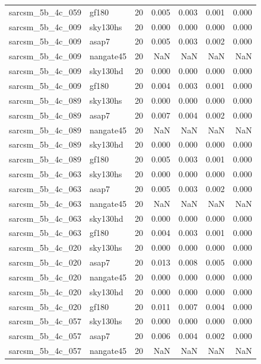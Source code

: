 \begin{tabular}{llrrrrr}
sarcsm\_5b\_4c\_059 & gf180 & 20 & 0.005 & 0.003 & 0.001 & 0.000 \\
sarcsm\_5b\_4c\_009 & sky130hs & 20 & 0.000 & 0.000 & 0.000 & 0.000 \\
sarcsm\_5b\_4c\_009 & asap7 & 20 & 0.005 & 0.003 & 0.002 & 0.000 \\
sarcsm\_5b\_4c\_009 & nangate45 & 20 & NaN & NaN & NaN & NaN \\
sarcsm\_5b\_4c\_009 & sky130hd & 20 & 0.000 & 0.000 & 0.000 & 0.000 \\
sarcsm\_5b\_4c\_009 & gf180 & 20 & 0.004 & 0.003 & 0.001 & 0.000 \\
sarcsm\_5b\_4c\_089 & sky130hs & 20 & 0.000 & 0.000 & 0.000 & 0.000 \\
sarcsm\_5b\_4c\_089 & asap7 & 20 & 0.007 & 0.004 & 0.002 & 0.000 \\
sarcsm\_5b\_4c\_089 & nangate45 & 20 & NaN & NaN & NaN & NaN \\
sarcsm\_5b\_4c\_089 & sky130hd & 20 & 0.000 & 0.000 & 0.000 & 0.000 \\
sarcsm\_5b\_4c\_089 & gf180 & 20 & 0.005 & 0.003 & 0.001 & 0.000 \\
sarcsm\_5b\_4c\_063 & sky130hs & 20 & 0.000 & 0.000 & 0.000 & 0.000 \\
sarcsm\_5b\_4c\_063 & asap7 & 20 & 0.005 & 0.003 & 0.002 & 0.000 \\
sarcsm\_5b\_4c\_063 & nangate45 & 20 & NaN & NaN & NaN & NaN \\
sarcsm\_5b\_4c\_063 & sky130hd & 20 & 0.000 & 0.000 & 0.000 & 0.000 \\
sarcsm\_5b\_4c\_063 & gf180 & 20 & 0.004 & 0.003 & 0.001 & 0.000 \\
sarcsm\_5b\_4c\_020 & sky130hs & 20 & 0.000 & 0.000 & 0.000 & 0.000 \\
sarcsm\_5b\_4c\_020 & asap7 & 20 & 0.013 & 0.008 & 0.005 & 0.000 \\
sarcsm\_5b\_4c\_020 & nangate45 & 20 & 0.000 & 0.000 & 0.000 & 0.000 \\
sarcsm\_5b\_4c\_020 & sky130hd & 20 & 0.000 & 0.000 & 0.000 & 0.000 \\
sarcsm\_5b\_4c\_020 & gf180 & 20 & 0.011 & 0.007 & 0.004 & 0.000 \\
sarcsm\_5b\_4c\_057 & sky130hs & 20 & 0.000 & 0.000 & 0.000 & 0.000 \\
sarcsm\_5b\_4c\_057 & asap7 & 20 & 0.006 & 0.004 & 0.002 & 0.000 \\
sarcsm\_5b\_4c\_057 & nangate45 & 20 & NaN & NaN & NaN & NaN \\

\end{tabular}
